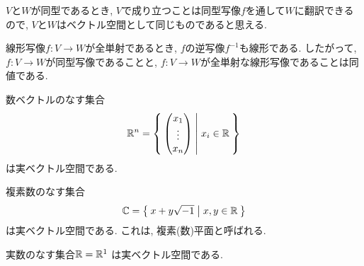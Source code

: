 \begin{remark}
  $V$と$W$が同型であるとき,
  $V$で成り立つことは同型写像$f$を通して$W$に翻訳できるので,
  $V$と$W$はベクトル空間として同じものであると思える.
\end{remark}
\begin{remark}
  線形写像$f\colon V\to W$が全単射であるとき,
  $f$の逆写像$f^{-1}$も線形である.
  したがって,
  $f\colon V\to W$が同型写像であることと,
  $f\colon V\to W$が全単射な線形写像であることは同値である.
\end{remark}
\begin{example}
  数ベクトルのなす集合
  \begin{align*}
    \mathbb{R}^n=\Set{\begin{pmatrix}x_1\\\vdots\\x_n\end{pmatrix}|x_i\in\mathbb{R}}
  \end{align*}
  は実ベクトル空間である. 
\end{example}
\begin{example}
  複素数のなす集合
  \begin{align*}
    \mathbb{C}=\Set{x+y\sqrt{-1}|x,y\in\mathbb{R}}
  \end{align*}
  は実ベクトル空間である.
  これは, 複素(数)平面と呼ばれる.
\end{example}
\begin{example}
  実数のなす集合$\mathbb{R}=\mathbb{R}^1$
  は実ベクトル空間である.
\end{example}

